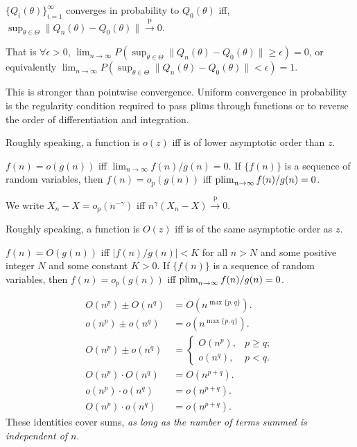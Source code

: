 \documentclass[8pt,letterpaper, landscape]{extarticle} %
\begin{document}
\begin{multicols}{3}
\begin{description}
 $ \{ Q_i(\theta) \}_{i=1}^{\infty} $ converges in probability to $ Q_0(\theta) $ iff, $ \sup_{\theta \in \Theta} \lVert Q_n(\theta) - Q_0(\theta) \rVert \xrightarrow{\text{p}} 0 $.

That is $ \forall \epsilon > 0 $, $ \lim_{n \to \infty} P( \sup_{\theta \in \Theta} \lVert Q_n(\theta) - Q_0(\theta) \rVert \geq \epsilon ) =0 $, or equivalently $ \lim_{n \to \infty} P( \sup_{\theta \in \Theta} \lVert Q_n(\theta) - Q_0(\theta) \rVert < \epsilon ) = 1 $.

This is stronger than pointwise convergence. Uniform convergence in probability is the regularity condition required to pass $ \operatorname*{plim} $s through functions or to reverse the order of differentiation and integration.

 Roughly speaking, a function is $ o(z) $ iff is of lower asymptotic order than $ z $.

$ f(n) = o(g(n)) $ iff $ \lim_{n \to \infty} f(n) / g(n) = 0 $. If $ \{ f(n) \} $ is a sequence of random variables, then $ f(n) = o_p (g(n)) $ iff $ \operatorname*{plim}_{n \to \infty} f(n) / g(n) = 0 $.

We write $ X_n - X = o_p (n^{- \gamma}) $ iff $ n^{\gamma}(X_n - X) \xrightarrow{\text{p}} 0 $. 

 Roughly speaking, a function is $ O(z) $ iff is of the same asymptotic order as $ z $.

$ f(n) = O(g(n)) $ iff $ | f(n) / g(n) | < K $ for all $ n > N $ and some positive integer $ N $ and some constant $ K >0 $. If $ \{ f(n) \} $ is a sequence of random variables, then $ f(n) = o_p (g(n)) $ iff $ \operatorname*{plim}_{n \to \infty} f(n) / g(n) = 0 $.

\begin{align*}
O(n^p) \pm O(n^q) &= O(n^{\max \{ p,q \}}). \\
o(n^p) \pm o(n^q) &= o(n^{\max \{ p,q \}}). \\
O(n^p) \pm o(n^q) &= \begin{cases} O(n^p), & p \geq q; \\ o(n^q), & p < q. \end{cases} \\
O(n^p) \cdot O(n^q) &= O(n^{p+q}). \\
o(n^p) \cdot o(n^q) &= o(n^{p+q}). \\
O(n^p) \cdot o(n^q) &= o(n^{p+q}).
\end{align*}
These identities cover sums, \textit{as long as the number of terms summed is independent of $ n $}.


\end{description}
\end{multicols}
\end{document}
